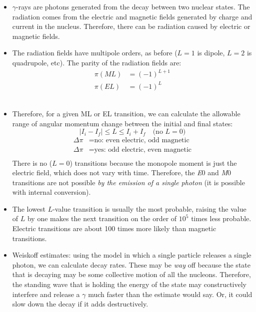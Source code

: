 \documentclass[letter]{article}
\begin{document}
\begin{itemize}
\item $\gamma$-rays are photons generated from the decay between two
  nuclear states. The radiation comes from the electric and magnetic
  fields generated by charge and current in the nucleus. Therefore,
  there can be radiation caused by electric or magnetic
  fields.~\cite[pp.330]{krane}
\item The radiation fields have multipole orders, as before ($L=1$ is
  dipole, $L=2$ is quadrupole, etc). The parity of the radiation
  fields are:
  \begin{equation*}
    \begin{split}
      \pi(ML)&=(-1)^{L+1} \\
      \pi(EL)&=(-1)^{L}
    \end{split}
  \end{equation*}
~\cite[pp.330]{krane}
\item Therefore, for a given ML or EL transition, we can calculate the
  allowable range of angular momentum change between the initial and
  final states:
  \begin{equation*}
    |I_i-I_f| \leq L \leq I_i+I_f \quad \text{(no }L=0\text{)}
  \end{equation*}
  \begin{equation*}
    \begin{split}
      \Delta\pi &= \text{no: even electric, odd magnetic} \\
      \Delta\pi &= \text{yes: odd electric, even magnetic} \\
    \end{split}
  \end{equation*}
There is no ($L=0$) transitions because the monopole moment is just
the electric field, which does not vary with time. Therefore, the \textit{E}0
and \textit{M}0 transitions are not possible \textit{by the emission
  of a single photon} (it is possible with internal conversion).~\cite[pp. 334]{krane}
\item The lowest $L$-value transition is usually the most probable,
  raising the value of $L$ by one makes the next transition on the order of
  $10^5$ times less probable. Electric transitions are about 100 times
  more likely than magnetic transitions.~\cite[pp. 335]{krane}
\item Weiskoff estimates: using the model in which a single particle
  releases a single photon, we can calculate decay rates. These may be
  \textit{way} off because the state that is decaying may be some
  collective motion of all the nucleons. Therefore, the standing wave
  that is holding the energy of the state may constructively interfere
  and release a $\gamma$ much faster than the estimate would say. Or,
  it could slow down the decay if it adds destructively.~\cite[Lec. 22]{lecture}
\end{itemize}
\end{document}
